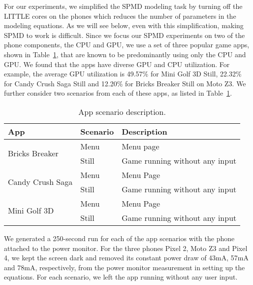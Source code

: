 For our experiments, we simplified the SPMD modeling task by turning
off the LITTLE cores 
on the phones %
which reduces the number of parameters in the modeling equations.
As we will see below, even with this simplification, making SPMD to work is difficult. 
Since we focus our SPMD experiments on two of the phone components, the CPU and GPU,
we use a set of {three} popular game apps, shown in Table~\ref{tab:app_scenario_description},
that are known to be predominantly
using only the CPU and GPU. We found that the apps have diverse GPU and CPU utilization. 
For example, the average GPU utilization is 49.57\% for Mini Golf 3D Still,
22.32\% for Candy Crush Saga Still and 12.20\% for Bricks Breaker Still on Moto Z3.
We further consider two scenarios from each of these apps,
as listed in Table~\ref{tab:app_scenario_description}.

\begin{table}[tp]
    \centering
    \caption{App scenario description.}
    \vspace{-0.1in}
    {\small
        \begin{tabular}{|p{15mm}|p{12mm}|p{46mm}|}
        \hline
        App & Scenario & Description \\
        \hline
        \hline
             \multirow{2}{15mm}{Bricks Breaker} & Menu & Menu page\\
             \cline{2-3}
             & Still & Game running without any input \\
             \hline
             \multirow{2}{15mm}{Candy Crush Saga} & Menu & Menu Page\\
             \cline{2-3}
             & Still &  Game running without any input \\
             \hline
             \multirow{2}{15mm}{Mini Golf 3D} & Menu & Menu Page \\
             \cline{2-3}
             & Still &  Game running without any input \\
            \hline
        \end{tabular}
    }
    \label{tab:app_scenario_description}
    \vspace{-0.2in}
\end{table}

We generated a 250-second run for each of the app scenarios with the
phone attached to the power monitor.  For the three phones Pixel 2,
Moto Z3 and Pixel 4, we kept the screen dark and removed its constant
power draw of 43mA, 57mA and 78mA, respectively, from the power monitor
measurement in setting up the equations.  For each scenario, we left the
app running without any user input.

